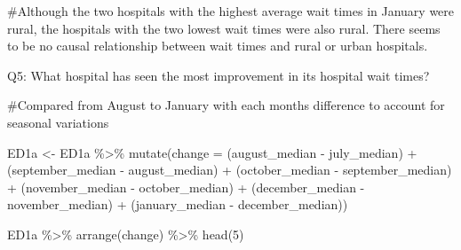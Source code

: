 \documentclass[
  letterpaper,
  DIV=11,
  numbers=noendperiod]{scrartcl}
\newenvironment{Shaded}{\begin{snugshade}}{\end{snugshade}}
\newcommand{\AttributeTok}[1]{\textcolor[rgb]{0.40,0.45,0.13}{#1}}
\newcommand{\CommentTok}[1]{\textcolor[rgb]{0.37,0.37,0.37}{#1}}
\newcommand{\DecValTok}[1]{\textcolor[rgb]{0.68,0.00,0.00}{#1}}
\newcommand{\FunctionTok}[1]{\textcolor[rgb]{0.28,0.35,0.67}{#1}}
\newcommand{\NormalTok}[1]{\textcolor[rgb]{0.00,0.23,0.31}{#1}}
\newcommand{\OtherTok}[1]{\textcolor[rgb]{0.00,0.23,0.31}{#1}}
\newcommand{\SpecialCharTok}[1]{\textcolor[rgb]{0.37,0.37,0.37}{#1}}
\begin{document}
\begin{Shaded}
\begin{Highlighting}[]
\CommentTok{\#Although the two hospitals with the highest average wait times in January were rural, the hospitals with the two lowest wait times were also rural. There seems to be no causal relationship between wait times and rural or urban hospitals.}
\end{Highlighting}
\end{Shaded}

Q5: What hospital has seen the most improvement in its hospital wait
times?

\begin{Shaded}
\begin{Highlighting}[]
\CommentTok{\#Compared from August to January with each month\textquotesingle{}s difference to account for seasonal variations}

\NormalTok{ED1a }\OtherTok{\textless{}{-}}\NormalTok{ ED1a }\SpecialCharTok{\%\textgreater{}\%} 
  \FunctionTok{mutate}\NormalTok{(}\AttributeTok{change =}\NormalTok{ (august\_median }\SpecialCharTok{{-}}\NormalTok{ july\_median) }\SpecialCharTok{+}\NormalTok{ (september\_median }\SpecialCharTok{{-}}\NormalTok{ august\_median) }\SpecialCharTok{+}\NormalTok{ (october\_median }\SpecialCharTok{{-}}\NormalTok{ september\_median) }\SpecialCharTok{+}\NormalTok{ (november\_median }\SpecialCharTok{{-}}\NormalTok{ october\_median) }\SpecialCharTok{+}\NormalTok{ (december\_median }\SpecialCharTok{{-}}\NormalTok{ november\_median) }\SpecialCharTok{+}\NormalTok{ (january\_median }\SpecialCharTok{{-}}\NormalTok{ december\_median))}

\NormalTok{ED1a }\SpecialCharTok{\%\textgreater{}\%} 
  \FunctionTok{arrange}\NormalTok{(change) }\SpecialCharTok{\%\textgreater{}\%} 
  \FunctionTok{head}\NormalTok{(}\DecValTok{5}\NormalTok{)}
\end{Highlighting}
\end{Shaded}
\end{document}
